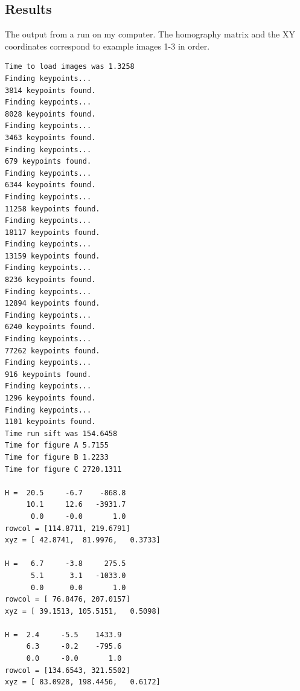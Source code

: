 \documentclass[10pt, titlepage, onecolumn, fleqn]{article}
\begin{document}
\subsection{Results}

The output from a run on my computer. The homography matrix and the XY coordinates correspond to example images 1-3 in order.
\begin{verbatim}
Time to load images was 1.3258
Finding keypoints... 
3814 keypoints found. 
Finding keypoints... 
8028 keypoints found. 
Finding keypoints... 
3463 keypoints found. 
Finding keypoints... 
679 keypoints found. 
Finding keypoints... 
6344 keypoints found. 
Finding keypoints... 
11258 keypoints found. 
Finding keypoints... 
18117 keypoints found. 
Finding keypoints... 
13159 keypoints found. 
Finding keypoints... 
8236 keypoints found. 
Finding keypoints... 
12894 keypoints found. 
Finding keypoints... 
6240 keypoints found. 
Finding keypoints... 
77262 keypoints found. 
Finding keypoints... 
916 keypoints found. 
Finding keypoints... 
1296 keypoints found. 
Finding keypoints... 
1101 keypoints found. 
Time run sift was 154.6458
Time for figure A 5.7155
Time for figure B 1.2233
Time for figure C 2720.1311

H =  20.5     -6.7    -868.8
     10.1     12.6   -3931.7
      0.0     -0.0       1.0
rowcol = [114.8711, 219.6791]
xyz = [ 42.8741,  81.9976,   0.3733]

H =   6.7     -3.8     275.5
      5.1      3.1   -1033.0
      0.0      0.0       1.0
rowcol = [ 76.8476, 207.0157]
xyz = [ 39.1513, 105.5151,   0.5098]

H =  2.4     -5.5    1433.9
     6.3     -0.2    -795.6
     0.0     -0.0       1.0
rowcol = [134.6543, 321.5502]
xyz = [ 83.0928, 198.4456,   0.6172]
\end{verbatim}
\end{document}
